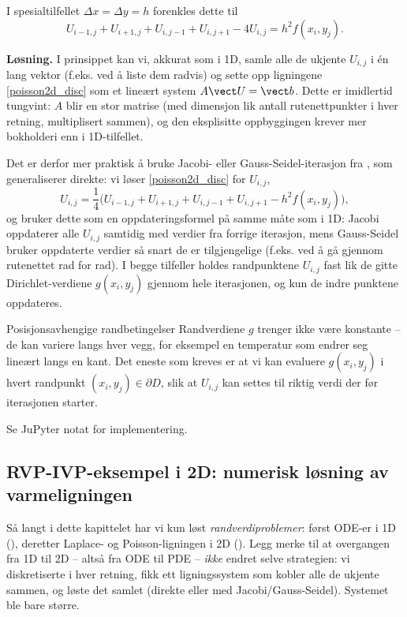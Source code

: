 I spesialtilfellet $\Delta x=\Delta y=h$ forenkles dette til
\begin{equation}\label{poisson2d_disc}
U_{i-1,j}+U_{i+1,j}+U_{i,j-1}+U_{i,j+1} - 4U_{i,j} = h^2f(x_i,y_j).
\end{equation}

\textbf{Løsning.} I prinsippet kan vi, akkurat som i 1D, samle alle de ukjente $U_{i,j}$ i én lang vektor (f.eks. ved å liste dem radvis) og sette opp ligningene \eqref{poisson2d_disc} som et lineært system $A\vect U=\vect b$. Dette er imidlertid tungvint: $A$ blir en stor matrise (med dimensjon lik antall rutenettpunkter i hver retning, multiplisert sammen), og den eksplisitte oppbyggingen krever mer bokholderi enn i 1D-tilfellet.

Det er derfor mer praktisk å bruke Jacobi- eller Gauss-Seidel-iterasjon fra , som generaliserer direkte: vi løser \eqref{poisson2d_disc} for $U_{i,j}$,
\begin{equation}\label{poisson2d_update}
U_{i,j} = \frac14\Big(U_{i-1,j}+U_{i+1,j}+U_{i,j-1}+U_{i,j+1} - h^2f(x_i,y_j)\Big),
\end{equation}
og bruker dette som en oppdateringsformel på samme måte som i 1D: Jacobi oppdaterer alle $U_{i,j}$ samtidig med verdier fra forrige iterasjon, mens Gauss-Seidel bruker oppdaterte verdier så snart de er tilgjengelige (f.eks. ved å gå gjennom rutenettet rad for rad). I begge tilfeller holdes randpunktene $U_{i,j}$ fast lik de gitte Dirichlet-verdiene $g(x_i,y_j)$ gjennom hele iterasjonen, og kun de indre punktene oppdateres.

\begin{rem}{Posisjonsavhengige randbetingelser}
Randverdiene $g$ trenger ikke være konstante -- de kan variere langs hver vegg, for eksempel en temperatur som endrer seg lineært langs en kant. Det eneste som kreves er at vi kan evaluere $g(x_i,y_j)$ i hvert randpunkt $(x_i,y_j)\in\partial D$, slik at $U_{i,j}$ kan settes til riktig verdi der før iterasjonen starter.
\end{rem}

Se JuPyter notat for implementering.

\subsection{RVP-IVP-eksempel i 2D: numerisk løsning av varmeligningen}\label{sect:varmeNum}

Så langt i dette kapittelet har vi kun løst \emph{randverdiproblemer}: først ODE-er i 1D (), deretter Laplace- og Poisson-ligningen i 2D (). Legg merke til at overgangen fra 1D til 2D -- altså fra ODE til PDE -- \emph{ikke} endret selve strategien: vi diskretiserte i hver retning, fikk ett ligningssystem som kobler alle de ukjente sammen, og løste det samlet (direkte eller med Jacobi/Gauss-Seidel). Systemet ble bare større.

